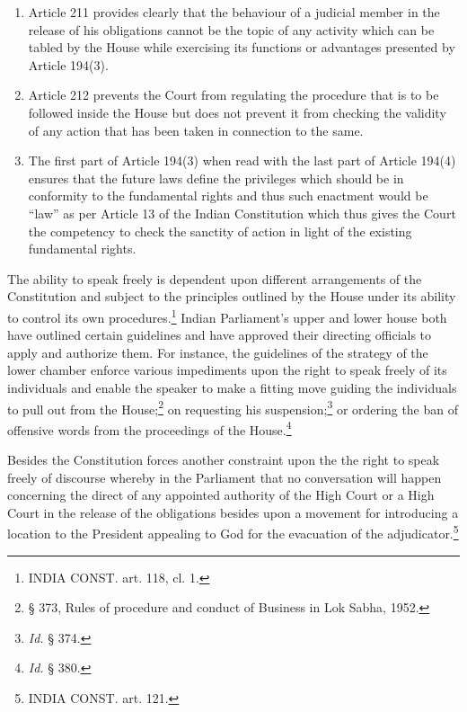 \begin{multicols}{2}
\begin{enumerate}[label=$\bullet$]
\item Article 211 provides clearly that the behaviour of a judicial member in the release of
his obligations cannot be the topic of any activity which can be tabled by the House
while exercising its functions or advantages presented by Article 194(3).

\item Article 212 prevents the Court from regulating the procedure that is to be followed
inside the House but does not prevent it from checking the validity of any action that
has been taken in connection to the same.

\item The first part of Article 194(3) when read with the last part of Article 194(4) ensures
that the future laws define the privileges which should be in conformity to the
fundamental rights and thus such enactment would be “law” as per Article 13 of the
Indian Constitution which thus gives the Court the competency to check the sanctity
of action in light of the existing fundamental rights.
\end{enumerate}

\vspace{-.2cm}


\noi
The ability to speak freely is dependent upon different arrangements of the Constitution and
subject to the principles outlined by the House under its ability to control its own
procedures.\footnote{INDIA CONST. art. 118, cl. 1.} Indian Parliament’s upper and lower house both have outlined certain
guidelines and have approved their directing officials to apply and authorize them. For
instance, the guidelines of the strategy of the lower chamber enforce various impediments
upon the right to speak freely of its individuals and enable the speaker to make a fitting move
guiding the individuals to pull out from the House;\footnote{§ 373, Rules of procedure and conduct of Business in Lok Sabha, 1952.} on requesting his suspension;\footnote{\textit{Id.} § 374.} or ordering the ban of offensive words from the proceedings of the House.\footnote{\textit{Id.} § 380.}

\noi
Besides the Constitution forces another constraint upon the the right to speak freely of
discourse whereby in the Parliament that no conversation will happen concerning the direct
of any appointed authority of the High Court or a High Court in the release of the obligations
besides upon a movement for introducing a location to the President appealing to God for the
evacuation of the adjudicator.\footnote{INDIA CONST. art. 121.}


\end{multicols}
